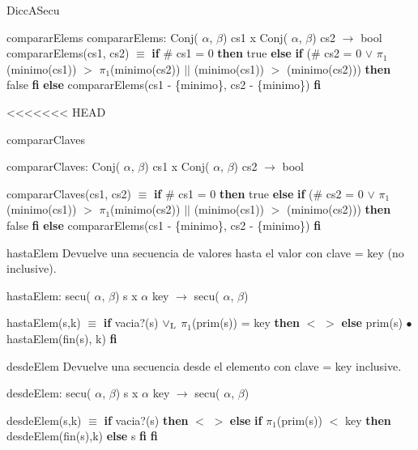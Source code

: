 \begin{DoxyParagraph}{\-Dicc\-A\-Secu}
\begin{DoxyParagraph}{comparar\+Elems}
comparar\+Elems\+: Conj( $\alpha$, $\beta$) cs1 x Conj( $\alpha$, $\beta$) cs2 $\to$ bool~\newline
comparar\+Elems(cs1, cs2) $\equiv$ {\bfseries if} \# cs1 = 0 {\bfseries then} true {\bfseries else} {\bfseries if} (\# cs2 = 0 $\lor$ $\pi_1$(minimo(cs1)) $>$ $\pi_1$(minimo(cs2)) $\vert$$\vert$ (minimo(cs1)) $>$ (minimo(cs2))) {\bfseries then} false {\bfseries fi} {\bfseries else} comparar\+Elems(cs1 -\/ \{minimo\}, cs2 -\/ \{minimo\}) {\bfseries fi} 
\end{DoxyParagraph}

<<<<<<< HEAD
\begin{DoxyParagraph}{comparar\-Claves}

\end{DoxyParagraph}
comparar\-Claves\-: \-Conj( $\alpha$, $\beta$) cs1 x \-Conj( $\alpha$, $\beta$) cs2 $\to$ bool\par
 comparar\-Claves(cs1, cs2) $\equiv$ {\bfseries if} \# cs1 = 0 {\bfseries then} true {\bfseries else} {\bfseries if} (\# cs2 = 0 $\lor$ $\pi_1$(minimo(cs1)) $>$ $\pi_1$(minimo(cs2)) $|$$|$ (minimo(cs1)) $>$ (minimo(cs2))) {\bfseries then} false {\bfseries fi} {\bfseries else} comparar\-Elems(cs1 -\/ \{minimo\}, cs2 -\/ \{minimo\}) {\bfseries fi} 

\begin{DoxyParagraph}{hasta\-Elem}
\-Devuelve una secuencia de valores hasta el valor con clave = key (no inclusive).
\end{DoxyParagraph}
hasta\-Elem\-: secu( $\alpha$, $\beta$) s x $\alpha$ key $\to$ secu( $\alpha$, $\beta$)\par
 hasta\-Elem(s,k) $\equiv$ {\bfseries if} vacia?(s) $\lor_{\rm L}$ $\pi_1$(prim(s)) = key {\bfseries then} $<$ $>$ {\bfseries else} prim(s) $\bullet$ hasta\-Elem(fin(s), k) {\bfseries fi} 

\begin{DoxyParagraph}{desde\-Elem}
\-Devuelve una secuencia desde el elemento con clave = key inclusive.
\end{DoxyParagraph}
desde\-Elem\-: secu( $\alpha$, $\beta$) s x $\alpha$ key $\to$ secu( $\alpha$, $\beta$)\par
 desde\-Elem(s,k) $\equiv$ {\bfseries if} vacia?(s) {\bfseries then} $<$ $>$ {\bfseries else} {\bfseries if} $\pi_1$(prim(s)) $<$ key {\bfseries then} desde\-Elem(fin(s),k) {\bfseries else} s {\bfseries fi} {\bfseries fi} 


\end{DoxyParagraph}
